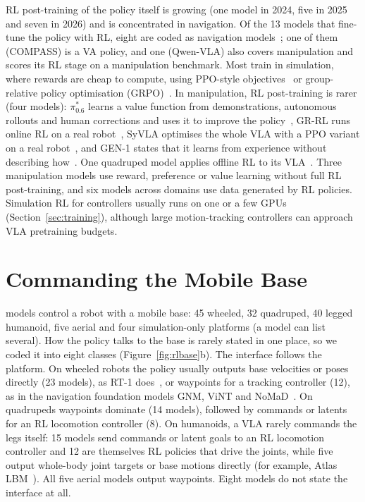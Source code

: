 \documentclass[applsci,review,submit,pdftex,oneauthor]{Definitions/mdpi}
\begin{document}
RL post-training of the policy itself is growing (one model in 2024, five in 2025 and seven in 2026) and is concentrated in navigation. Of the 13 models that fine-tune the policy with RL, eight are coded as navigation models~\cite{ax250216372,ax241214401,ax250617221,ax260211598,ax260108665,ax260202459,ax260830935,ax260530280}; one of them (COMPASS) is a VA policy, and one (Qwen-VLA) also covers manipulation and scores its RL stage on a manipulation benchmark. Most train in simulation, where rewards are cheap to compute, using PPO-style objectives~\cite{schulman2017ppo} or group-relative policy optimisation (GRPO)~\cite{shao2024deepseekmath}. In manipulation, RL post-training is rarer (four models): $\pi^*_{0.6}$ learns a value function from demonstrations, autonomous rollouts and human corrections and uses it to improve the policy~\cite{ax251114759}, GR-RL runs online RL on a real robot~\cite{ax251201801}, SyVLA optimises the whole VLA with a PPO variant on a real robot~\cite{ax260609009}, and GEN-1 states that it learns from experience without describing how~\cite{web-gen-1}. One quadruped model applies offline RL to its VLA~\cite{ax250308007}. Three manipulation models use reward, preference or value learning without full RL post-training, and six models across domains use data generated by RL policies. Simulation RL for controllers usually runs on one or a few GPUs (Section~\ref{sec:training}), although large motion-tracking controllers can approach VLA pretraining budgets.

\section{Commanding the Mobile Base}\label{sec:base}

\nMobile{} models control a robot with a mobile base: 45 wheeled, 32 quadruped, 40 legged humanoid, five aerial and four simulation-only platforms (a model can list several). How the policy talks to the base is rarely stated in one place, so we coded it into eight classes (Figure~\ref{fig:rlbase}b). The interface follows the platform. On wheeled robots the policy usually outputs base velocities or poses directly (23 models), as RT-1 does~\cite{ax221206817}, or waypoints for a tracking controller (12), as in the navigation foundation models GNM, ViNT and NoMaD~\cite{ax221003370,ax230614846,ax231007896}. On quadrupeds waypoints dominate (14 models), followed by commands or latents for an RL locomotion controller (8). On humanoids, a VLA rarely commands the legs itself: 15 models send commands or latent goals to an RL locomotion controller and 12 are themselves RL policies that drive the joints, while five output whole-body joint targets or base motions directly (for example, Atlas LBM~\cite{web-atlas-lbm}). All five aerial models output waypoints. Eight models do not state the interface at all.
\end{document}
